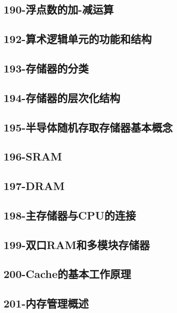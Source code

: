 \subsection{190-浮点数的加-减运算}

\subsection{192-算术逻辑单元的功能和结构}

\subsection{193-存储器的分类}

\subsection{194-存储器的层次化结构}

\subsection{195-半导体随机存取存储器基本概念}

\subsection{196-SRAM}

\subsection{197-DRAM}

\subsection{198-主存储器与CPU的连接}

\subsection{199-双口RAM和多模块存储器}

\subsection{200-Cache的基本工作原理}

\subsection{201-内存管理概述}

